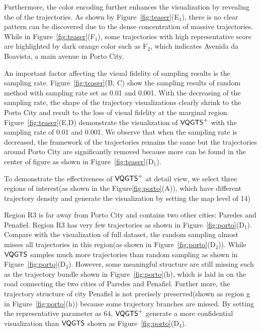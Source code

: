 Furthermore, the color encoding further enhances the visualization by revealing the  of the trajectories.
As shown by Figure~\ref{fig:teaser}(E$_1$), there is no clear pattern can be discovered due to the dense concentration of massive trajectories. While in Figure~\ref{fig:teaser}(F$_1$), some trajectories with high representative score are highlighted by dark orange color such as F$_2$, which indicates Avenida da Boavista, a main avenue in Porto City. 
 
 
An important factor affecting the visual fidelity of sampling results is the sampling rate. Figure~\ref{fig:teaser}(B, C) show the sampling results of random method with sampling rate set as 0.01 and 0.001. With the decreasing of the sampling rate, the shape of the trajectory visualizations clearly shrink to the Porto City and result to the loss of visual fidelity at the marginal region. Figure~\ref{fig:teaser}(E,D) demonstrate the visualization of $\mathsf{VQGTS}^{+}$ with the sampling rate of 0.01 and 0.001. We observe that when the sampling rate is decreased, the framework of the trajectories remains the same but the trajectories around Porto City are significantly removed because more  can be found in the center of figure as shown in Figure~\ref{fig:teaser}(D$_1$). 

To demonstrate the effectiveness of $\mathsf{VQGTS}^{+}$ at detail view, we select three regions of interest(as shown in the Figure\ref{fig:porto}(A)), which have different trajectory density and generate the visualization by setting the map level of 14) 
   
Region R3 is far away from Porto City and contains two other cities: Paredes and Penafiel. Region R3 has very few trajectories as shown in Figure~\ref{fig:porto}(D$_1$).  Compare with the visualization of full dataset, the random sampling almost misses all trajectories in this region(as shown in Figure~\ref{fig:porto}(D$_2$)). While $\mathsf{VQGTS}$ samples much more trajectories than random sampling as shown in Figure~\ref{fig:porto}(D$_3$). However, some meaningful structure are still missing such as the trajectory bundle shown in Figure~\ref{fig:porto}(h), which is laid in on the road  connecting the two cities of Paredes and Penafiel. Further more, the trajectory structure of city Penafiel is not precisely preserved(shown as region g in Figure~\ref{fig:porto}(h)) because some  trajectory branches are missed.  
By setting the representative parameter as 64, $\mathsf{VQGTS}^{+}$ generate a more confidential visualization than $\mathsf{VQGTS}$ shown as Figure~\ref{fig:porto}(D$_4$). 

